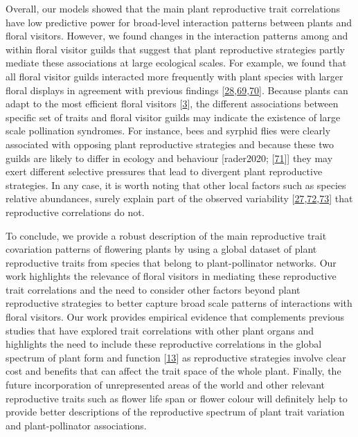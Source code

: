 \documentclass[
  12pt,
  a4paper,
]{article}
\begin{document}
Overall, our models showed that the main plant reproductive trait correlations have low predictive power for broad-level interaction patterns between plants and floral visitors. However, we found changes in the interaction patterns among and within floral visitor guilds that suggest that plant reproductive strategies partly mediate these associations at large ecological scales. For example, we found that all floral visitor guilds interacted more frequently with plant species with larger floral displays in agreement with previous findings {[}\protect\hyperlink{ref-lazaro2013}{28},\protect\hyperlink{ref-hegland2005}{69},\protect\hyperlink{ref-kaiser2014}{70}{]}. Because plants can adapt to the most efficient floral visitors {[}\protect\hyperlink{ref-fenster2004}{3}{]}, the different associations between specific set of traits and floral visitor guilds may indicate the existence of large scale pollination syndromes. For instance, bees and syrphid flies were clearly associated with opposing plant reproductive strategies and because these two guilds are likely to differ in ecology and behaviour {[}rader2020; {[}\protect\hyperlink{ref-foldesi2021}{71}{]}{]} they may exert different selective pressures that lead to divergent plant reproductive strategies. In any case, it is worth noting that other local factors such as species relative abundances, surely explain part of the observed variability {[}\protect\hyperlink{ref-bartomeus2016}{27},\protect\hyperlink{ref-vazquez2007}{72},\protect\hyperlink{ref-encinas2012}{73}{]} that reproductive correlations do not.

To conclude, we provide a robust description of the main reproductive trait covariation patterns of flowering plants by using a global dataset of plant reproductive traits from species that belong to plant-pollinator networks. Our work highlights the relevance of floral visitors in mediating these reproductive trait correlations and the need to consider other factors beyond plant reproductive strategies to better capture broad scale patterns of interactions with floral visitors. Our work provides empirical evidence that complements previous studies that have explored trait correlations with other plant organs and highlights the need to include these reproductive correlations in the global spectrum of plant form and function {[}\protect\hyperlink{ref-diaz2016}{13}{]} as reproductive strategies involve clear cost and benefits that can affect the trait space of the whole plant. Finally, the future incorporation of unrepresented areas of the world and other relevant reproductive traits such as flower life span or flower colour will definitely help to provide better descriptions of the reproductive spectrum of plant trait variation and plant-pollinator associations.
\end{document}
